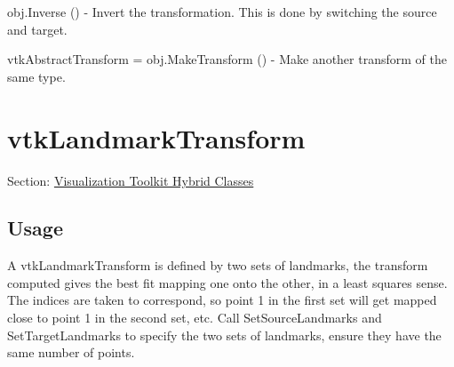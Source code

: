 \begin{DoxyItemize}
\item {\ttfamily obj.\-Inverse ()} -\/ Invert the transformation. This is done by switching the source and target.  
\item {\ttfamily vtk\-Abstract\-Transform = obj.\-Make\-Transform ()} -\/ Make another transform of the same type.  
\end{DoxyItemize}\hypertarget{vtkhybrid_vtklandmarktransform}{}\section{vtk\-Landmark\-Transform}\label{vtkhybrid_vtklandmarktransform}
Section\-: \hyperlink{sec_vtkhybrid}{Visualization Toolkit Hybrid Classes} \hypertarget{vtkwidgets_vtkxyplotwidget_Usage}{}\subsection{Usage}\label{vtkwidgets_vtkxyplotwidget_Usage}
A vtk\-Landmark\-Transform is defined by two sets of landmarks, the transform computed gives the best fit mapping one onto the other, in a least squares sense. The indices are taken to correspond, so point 1 in the first set will get mapped close to point 1 in the second set, etc. Call Set\-Source\-Landmarks and Set\-Target\-Landmarks to specify the two sets of landmarks, ensure they have the same number of points.

